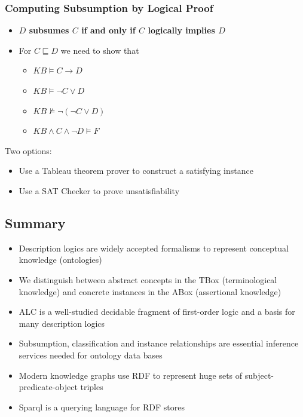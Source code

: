 \documentclass[conference, a4paper]{styles/acmsiggraph}
\begin{document}
        \subsubsection{Computing Subsumption by Logical Proof}
            \begin{itemize}
                \item \textbf{$D$ subsumes $C$ if and only if $C$ logically implies $D$}
                \item For $C \sqsubseteq D$ we need to show that
                    \begin{itemize}
                        \item $KB \vDash C \rightarrow D$
                        \item $KB \vDash \lnot C \vee D$
                        \item $KB \nvDash \lnot (\lnot C \vee D)$
                        \item $KB \wedge C \wedge \lnot D \vDash F$
                    \end{itemize}
            \end{itemize}
            Two options:
            \begin{itemize}
                \item Use a Tableau theorem prover to construct a satisfying instance
                \item Use a SAT Checker to prove unsatisfiability
            \end{itemize}
        
    \subsection{Summary}
        \begin{itemize}
            \item Description logics are widely accepted formalisms to represent conceptual knowledge (ontologies)
            \item We distinguish between abstract concepts in the TBox (terminological knowledge) and concrete instances in the ABox (assertional knowledge)
            \item ALC is a well-studied decidable fragment of first-order logic and a basis for many description logics
            \item Subsumption, classification and instance relationships are essential inference services needed for ontology data bases
            \item Modern knowledge graphs use RDF to represent huge sets of subject-predicate-object triples
            \item Sparql is a querying language for RDF stores
        \end{itemize}
\end{document}
